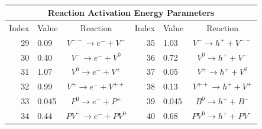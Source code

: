 \documentclass[pdf,ps2pdf,11pt]{SANDreport}
\begin{document}
{\begin{table}[p]
\begin{center}
\begin{tabular}{|r|l|c|r|l|c|}
\hline
\end{tabular} \\[3ex]
\begin{tabular}{|r|l|c|r|l|c|}
\hline 
\multicolumn{6}{|c|}{Reaction Activation Energy Parameters} \\
\hline
\multicolumn{1}{|c|}{Index} & 
\multicolumn{1}{c|}{Value} & 
\multicolumn{1}{c|}{Reaction} & 
\multicolumn{1}{c|}{Index} & 
\multicolumn{1}{c|}{Value} & 
\multicolumn{1}{c|}{Reaction} \\ 
\hline\hline
29 & 0.09 & $V^{--} \rightarrow e^- + V^-$ & 35 & 1.03 & $V^- \rightarrow h^+ + V^{--}$ \\
30 & 0.40 & $V^- \rightarrow e^- + V^0$    & 36 & 0.72 & $V^0 \rightarrow h^+ + V^-$    \\
31 & 1.07 & $V^0 \rightarrow e^- + V^+$    & 37 & 0.05 & $V^+ \rightarrow h^+ + V^0$    \\
32 & 0.99 & $V^+ \rightarrow e^- + V^{++}$ & 38 & 0.13 & $V^{++} \rightarrow h^+ + V^+$ \\ 
33 & 0.045 & $P^0 \rightarrow e^- + P^+$    & 39 & 0.045 & $B^0 \rightarrow h^+ + B^-$    \\
34 & 0.44 & $PV^- \rightarrow e^- + PV^0$  & 40 & 0.68 & $PV^0 \rightarrow h^+ + PV^-$  \\
\hline
\end{tabular}
\end{center}
\end{table}
\esinglespace}
\end{document}
